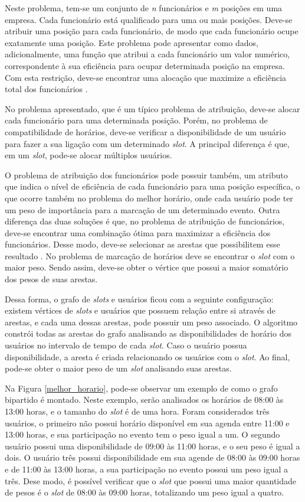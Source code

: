 Neste problema, tem-se um conjunto de \textit{n} funcionários e \textit{m} posições em uma empresa. Cada funcionário está qualificado para uma ou mais posições. Deve-se atribuir uma posição para cada funcionário, de modo que cada funcionário ocupe exatamente uma posição. Este problema pode apresentar como dados, adicionalmente, uma função que atribui a cada funcionário um valor numérico, correspondente à sua eficiência para ocupar determinada posição na empresa. Com esta restrição, deve-se encontrar uma alocação que maximize a eficiência total dos funcionários \cite{Figuerado:Szwarcfiter:1999}.

No problema apresentado, que é um típico problema de atribuição, deve-se alocar cada funcionário para uma determinada posição. Porém, no problema de compatibilidade de horários, deve-se verificar a disponibilidade de um usuário para fazer a sua ligação com um determinado \textit{slot}. A principal diferença é que, em um \textit{slot}, pode-se alocar múltiplos usuários.

O problema de atribuição dos funcionários pode possuir também, um atributo que indica o nível de eficiência de cada funcionário para uma posição específica, o que ocorre também no problema do melhor horário, onde cada usuário pode ter um peso de importância para a marcação de um determinado evento. Outra diferença das duas soluções é que, no problema de atribuição de funcionários, deve-se encontrar uma combinação ótima para maximizar a eficiência dos funcionários. Desse modo, deve-se selecionar as arestas que possibilitem esse resultado \cite{Figuerado:Szwarcfiter:1999}. No problema de marcação de horários deve se encontrar o \textit{slot} com o maior peso. Sendo assim, deve-se obter o vértice que possui a maior somatório dos pesos de suas arestas.

Dessa forma, o grafo de \textit{slots} e usuários ficou com a seguinte configuração: existem vértices de \textit{slots} e usuários que possuem relação entre si através de arestas, e cada uma dessas arestas, pode possuir um peso associado. O algoritmo constrói todas as arestas do grafo analisando as disponibilidades de horário dos usuários no intervalo de tempo de cada \textit{slot}. Caso o usuário possua disponibilidade, a aresta é criada relacionando os usuários com o \textit{slot}. Ao final, pode-se obter o maior peso de um \textit{slot} analisando suas arestas.

Na Figura \ref{melhor_horario}, pode-se observar um exemplo de como o grafo bipartido é montado. Neste exemplo, serão analisados os horários de 08:00 às 13:00 horas, e o tamanho do \textit{slot} é de uma hora. Foram considerados três usuários, o primeiro não possui horário disponível em sua agenda entre 11:00 e 13:00 horas, e sua participação no evento tem o peso igual a um. O segundo usuário possui uma disponibilidade de 09:00 às 11:00 horas, e o seu peso é igual a dois. O usuário três possui disponibilidade em sua agende de 08:00 às 09:00 horas e de 11:00 às 13:00 horas, a sua participação no evento possui um peso igual a três. Dese modo, é possível verificar que o \textit{slot} que possui uma maior quantidade de pesos é o \textit{slot} de 08:00 às 09:00 horas, totalizando um peso igual a quatro.

